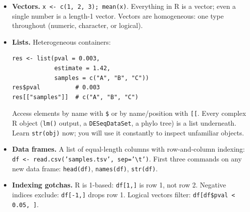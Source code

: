 \begin{itemize}[nosep]
  \item \textbf{Vectors.} \texttt{x <- c(1, 2, 3); mean(x)}. Everything in R is a vector; even a single number is a length-1 vector. Vectors are homogeneous: one type throughout (numeric, character, or logical).
  \item \textbf{Lists.} Heterogeneous containers:
    \begin{lstlisting}
res <- list(pval = 0.003,
            estimate = 1.42,
            samples = c("A", "B", "C"))
res$pval          # 0.003
res[["samples"]]  # c("A", "B", "C")
    \end{lstlisting}
    Access elements by name with \texttt{\$} or by name/position with \texttt{[[}. Every complex R object (\texttt{lm()} output, a \texttt{DESeqDataSet}, a phylo tree) is a list underneath. Learn \texttt{str(obj)} now; you will use it constantly to inspect unfamiliar objects.
  \item \textbf{Data frames.} A list of equal-length columns with row-and-column indexing: \texttt{df <- read.csv('samples.tsv', sep='\textbackslash t')}. First three commands on any new data frame: \texttt{head(df)}, \texttt{names(df)}, \texttt{str(df)}.
  \item \textbf{Indexing gotchas.} R is 1-based: \texttt{df[1,]} is row 1, not row 2. Negative indices exclude: \texttt{df[-1,]} drops row 1. Logical vectors filter: \texttt{df[df\$pval < 0.05, ]}.
\end{itemize}
